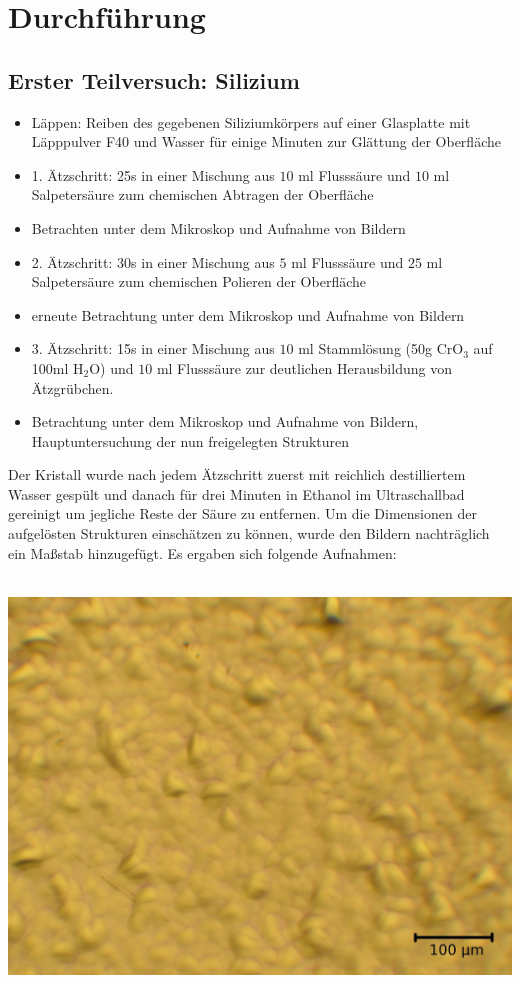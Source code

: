 \documentclass[german,  %
parskip=full,  %
]{scrartcl}
\begin{document}
\section{Durchführung}
\subsection{Erster Teilversuch: Silizium}
\begin{itemize}
\item Läppen: Reiben des gegebenen Siliziumkörpers auf einer Glasplatte mit Läpppulver F40 und Wasser für einige Minuten zur Glättung der Oberfläche
\item 1. Ätzschritt: 25s in einer Mischung aus $10$ ml Flusssäure und $10$ ml Salpetersäure zum chemischen Abtragen der Oberfläche
\item Betrachten unter dem Mikroskop und Aufnahme von Bildern
\item 2. Ätzschritt: 30s in einer Mischung aus $5$ ml Flusssäure und $25$ ml Salpetersäure zum chemischen Polieren der Oberfläche
\item erneute Betrachtung unter dem Mikroskop und Aufnahme von Bildern
\item 3. Ätzschritt: 15s in einer Mischung aus $10$ ml Stammlösung (50g \(\mathrm{CrO}_3\) auf 100ml \(\mathrm{H}_2\mathrm{O}\)) und $10$ ml Flusssäure zur deutlichen Herausbildung von Ätzgrübchen.
\item Betrachtung unter dem Mikroskop und Aufnahme von Bildern, Hauptuntersuchung der nun freigelegten Strukturen
\end{itemize}
Der Kristall wurde nach jedem Ätzschritt zuerst mit reichlich destilliertem Wasser gespült und danach für drei Minuten in Ethanol im Ultraschallbad gereinigt um jegliche Reste der Säure zu entfernen. Um die Dimensionen der aufgelösten Strukturen einschätzen zu können, wurde den Bildern nachträglich ein Maßstab hinzugefügt. Es ergaben sich folgende Aufnahmen: \\\\
\begin{minipage}{0.45\textwidth}\centering
\includegraphics[scale=0.09]{Si_1Sch_25s_12_5x_00002.jpg}
\end{minipage}
\end{document}
